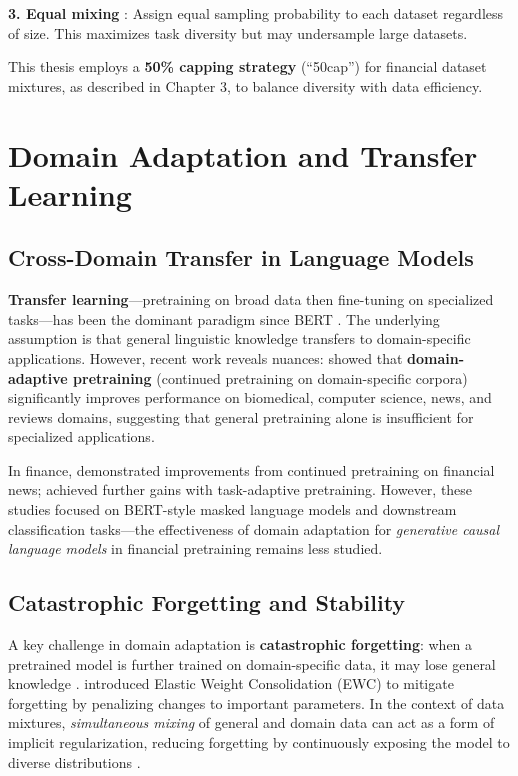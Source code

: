 \textbf{3. Equal mixing} \parencite{sanh2022multitask}: Assign equal sampling probability to each dataset regardless of size. This maximizes task diversity but may undersample large datasets.

This thesis employs a \textbf{50\% capping strategy} (``50cap'') for financial dataset mixtures, as described in Chapter 3, to balance diversity with data efficiency.

\section{Domain Adaptation and Transfer Learning}

\subsection{Cross-Domain Transfer in Language Models}

\textbf{Transfer learning}---pretraining on broad data then fine-tuning on specialized tasks---has been the dominant paradigm since BERT \parencite{devlin2019bert}. The underlying assumption is that general linguistic knowledge transfers to domain-specific applications. However, recent work reveals nuances: \textcite{gururangan2020don} showed that \textbf{domain-adaptive pretraining} (continued pretraining on domain-specific corpora) significantly improves performance on biomedical, computer science, news, and reviews domains, suggesting that general pretraining alone is insufficient for specialized applications.

In finance, \textcite{araci2019finbert} demonstrated improvements from continued pretraining on financial news; \textcite{yang2020finbert} achieved further gains with task-adaptive pretraining. However, these studies focused on BERT-style masked language models and downstream classification tasks---the effectiveness of domain adaptation for \textit{generative causal language models} in financial pretraining remains less studied.

\subsection{Catastrophic Forgetting and Stability}

A key challenge in domain adaptation is \textbf{catastrophic forgetting}: when a pretrained model is further trained on domain-specific data, it may lose general knowledge \parencite{mccloskey1989catastrophic, french1999catastrophic}. \textcite{kirkpatrick2017overcoming} introduced Elastic Weight Consolidation (EWC) to mitigate forgetting by penalizing changes to important parameters. In the context of data mixtures, \textit{simultaneous mixing} of general and domain data can act as a form of implicit regularization, reducing forgetting by continuously exposing the model to diverse distributions \parencite{arivazhagan2019massively,raffel2020exploring}.

